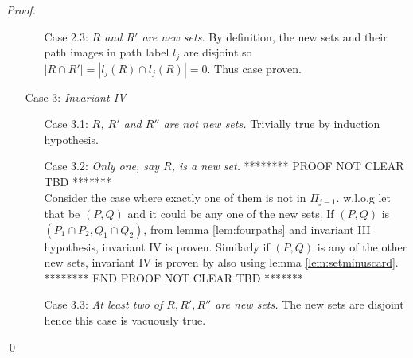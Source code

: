 \documentclass{llncs}
\def\cF{{\cal F}}
\def\cl{\mathpzc{l}}
\begin{document}
\begin{proof}
\begin{enumerate}
\begin{enumerate}
    \item [Case 2.3:] {\em $R$ and $R'$ are new sets.} By definition,
      the new sets and their path images in path label $l_j$ are
      disjoint so $|R \cap R'| = |l_j(R) \cap l_j(R)| = 0$. Thus case
      proven.
    \end{enumerate}
  \item [Case 3:] {\em Invariant IV}
    \begin{enumerate}
    \item [Case 3.1:] {\em $R$, $R'$ and $R''$ are not new sets.} Trivially
      true by induction hypothesis.
    \item [Case 3.2:] {\em Only one, say $R$, is a new set.}
      ******** PROOF NOT CLEAR TBD ******* \\
      Consider the case where exactly one of them is
      not in $\Pi_{j-1}$. w.l.o.g let that be $(P,Q)$ and it could be any
  one of the new sets. If $(P,Q)$ is $(P_1 \cap P_2, Q_1 \cap Q_2)$,
  from lemma \ref{lem:fourpaths} and invariant III hypothesis,
  invariant IV is proven. Similarly if $(P,Q)$ is any of the other new
  sets, invariant IV is proven by also using lemma
  \ref{lem:setminuscard}.\\
  ******** END PROOF NOT CLEAR TBD ******* 

    \item [Case 3.3:] {\em At least two of $R, R', R''$ are new sets.}
      The new sets are disjoint hence this case is vacuously true.
    \end{enumerate}
  \end{enumerate} \qed

\end{proof}



\noindent
\end{document}
